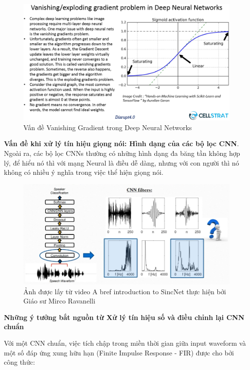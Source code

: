 \documentclass{article}
\begin{document}
	\begin{figure}[H]
		\centering
		\includegraphics[width=1\textwidth]{images/Vanishing-Gradients-in-DNN.png}
		\caption{Vấn đề Vanishing Gradient trong Deep Neural Networks}
		\label{fig:writing-thesis}
	\end{figure}
	\textbf{Vấn đề khi xử lý tín hiệu giọng nói: Hình dạng của các bộ lọc CNN}. Ngoài ra, các bộ lọc CNNs thường có những hình dạng đa băng tần không hợp lý, để hiểu nó thì với mạng Neural là điều dễ dàng, nhưng với con người thì nó không có nhiều ý nghĩa trong việc thể hiện giọng nói.
	\begin{figure}[H]
		\centering
		\includegraphics[width=1\textwidth]{images/interpretability_problems.png}
		\caption{Ảnh được lấy từ video A bref introduction to SincNet thực hiện bởi Giáo sư Mirco Ravanelli}
		\label{fig:writing-thesis}
	\end{figure}

	\textbf{Những ý tưởng bắt nguồn từ Xử lý tín hiệu số và điều chỉnh lại CNN chuẩn}
	
	Với một CNN chuẩn, việc tích chập trong miền thời gian giữa input waveform và một số đáp ứng xung hữu hạn (Finite Impulse Response - FIR) được cho bởi công thức:
	
\end{document}
